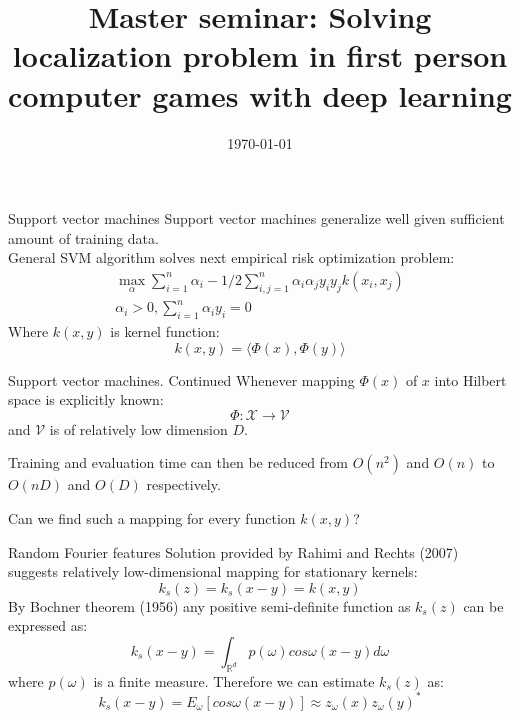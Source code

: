 \documentclass[unknownkeysallowed]{beamer}
\title[Master seminar:  Solving localization problem in first person computer games with deep learning]{Master seminar:  Solving localization problem in first person computer games with deep learning}
\author[Y. Selivonchyk]{\highlight{Yauheni Selivonchyk}\inst{1}}
\institute[University of Bonn]
{
  \inst{1}%
  Student of Master Computer Science,\\
  University of Bonn
}
\date{\today}
\begin{document}
\lstset{language=Python}

\begin{frame}
  \titlepage
\end{frame}


\begin{frame}{Support vector machines}
Support vector machines generalize well given sufficient amount of training data.\\
General SVM algorithm solves next empirical risk optimization problem:
\begin{equation}\label{eq:dual}
\begin{aligned}
\max\limits_{\alpha} \sum_{i=1}^n \alpha_i -1/2 \sum_{i,j=1}^n \alpha_i\alpha_j y_i y_j  k(x_i, x_j) \\
\alpha_i > 0 , \sum_{i=1}^n\alpha_i y_i=0
\end{aligned}
\end{equation}
Where $k(x, y)$ is kernel function:
\begin{equation}\label{eq:kernel}
k(x,y)=\langle\Phi(x), \Phi(y)\rangle
\end{equation}
\end{frame}

\begin{frame}{Support vector machines. Continued}
Whenever mapping $\Phi(x)$ of $x$ into Hilbert space is explicitly known:
\begin{equation}\label{eq:kernel}
\Phi: \mathcal{X} \to \mathcal{V}
\end{equation}
and $\mathcal{V}$ is of relatively low dimension $D$.

Training and evaluation time can then be reduced from $O(n^2)$ and $O(n)$ to $O(nD)$ and $O(D)$ respectively.
\vspace{1cm}
\begin{center}
Can we find such a mapping for every function $k(x, y)$?
\end{center}
\end{frame}

\begin{frame}{Random Fourier features}
  Solution provided by Rahimi and Rechts (2007) suggests relatively low-dimensional mapping for stationary kernels:
  \begin{equation}\label{eq:stationary}
k_s(z) = k_s(x-y) = k(x, y)
\end{equation}
By Bochner theorem (1956) any positive semi-definite function as $k_s(z)$ can be expressed as:
\begin{equation}
k_s(x-y)= \int_{\mathbb{R}^d} p(\omega) cos \omega(x-y) d\omega
\end{equation}
where $p(\omega)$ is a finite measure. Therefore we can estimate $k_s(z)$ as:
\begin{equation}
k_s(x-y) = E_\omega[cos\omega(x-y)] \approx z_\omega(x)z_\omega(y)^*
\end{equation}
\end{frame}
\end{document}
